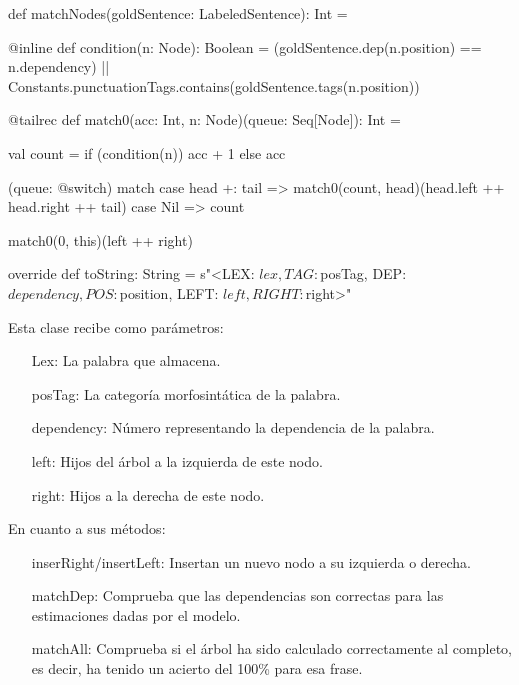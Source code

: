 \begin{scala2}
{  def matchNodes(goldSentence: LabeledSentence): Int = {
    @inline def condition(n: Node): Boolean =
      (goldSentence.dep(n.position) == n.dependency) || Constants.punctuationTags.contains(goldSentence.tags(n.position))

    @tailrec
    def match0(acc: Int, n: Node)(queue: Seq[Node]): Int = {
      val count = if (condition(n)) acc + 1 else acc

      (queue: @switch) match {
        case head +: tail => match0(count, head)(head.left ++ head.right ++ tail)
        case Nil => count
      }
    }

    match0(0, this)(left ++ right)
  }

  override def toString: String = s"<LEX: $lex, TAG: $posTag, DEP: $dependency, POS: $position, LEFT: $left, RIGHT:  $right>"
}
\end{scala2}
Esta clase recibe como parámetros:
\begin{itemize}
   \item [Lex:] La palabra que almacena.
   \item [posTag:] La categoría morfosintática de la palabra.
   \item [dependency:] Número representando la dependencia de la palabra.
   \item [left:] Hijos del árbol a la izquierda de este nodo.
   \item [right:] Hijos a la derecha de este nodo.
\end{itemize}
En cuanto a sus métodos:
\begin{itemize}
   \item [inserRight/insertLeft:] Insertan un nuevo nodo a su izquierda o
     derecha.
   \item [matchDep:] Comprueba que las dependencias son correctas para las
     estimaciones dadas por el modelo.
   \item [matchAll:] Comprueba si el árbol ha sido calculado correctamente al
     completo, es decir, ha tenido un acierto del 100\% para esa frase.
\end{itemize}

